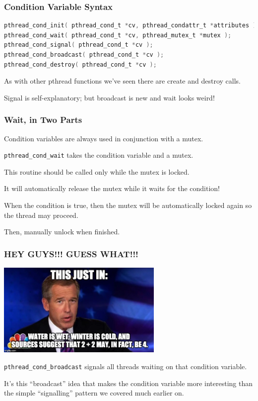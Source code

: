 \begin{frame}[fragile]
\frametitle{Condition Variable Syntax}

\begin{lstlisting}[language=C]
pthread_cond_init( pthread_cond_t *cv, pthread_condattr_t *attributes );
pthread_cond_wait( pthread_cond_t *cv, pthread_mutex_t *mutex );
pthread_cond_signal( pthread_cond_t *cv );
pthread_cond_broadcast( pthread_cond_t *cv );
pthread_cond_destroy( pthread_cond_t *cv );
\end{lstlisting}

As with other pthread functions we've seen there are create and destroy calls.

Signal is self-explanatory; but broadcast is new and wait looks weird!

\end{frame}


\begin{frame}
\frametitle{Wait, in Two Parts}

Condition variables are always used in conjunction with a mutex. 

\texttt{pthread\_cond\_wait} takes the condition variable and a mutex. 

This routine should be called only while the mutex is locked. 

It will automatically release the mutex while it waits for the condition!

When the condition is true, then the mutex will be automatically locked again so the thread may proceed.

Then, manually unlock when finished.

\end{frame}

\begin{frame}
\frametitle{HEY GUYS!!! GUESS WHAT!!!}
\begin{center}
	\includegraphics[width=0.6\textwidth]{images/newsanchor.jpg}
\end{center}

\texttt{pthread\_cond\_broadcast} signals all threads waiting on that condition variable. 

It's this ``broadcast'' idea that makes the condition variable more interesting than the simple ``signalling'' pattern we covered much earlier on.

\end{frame}

